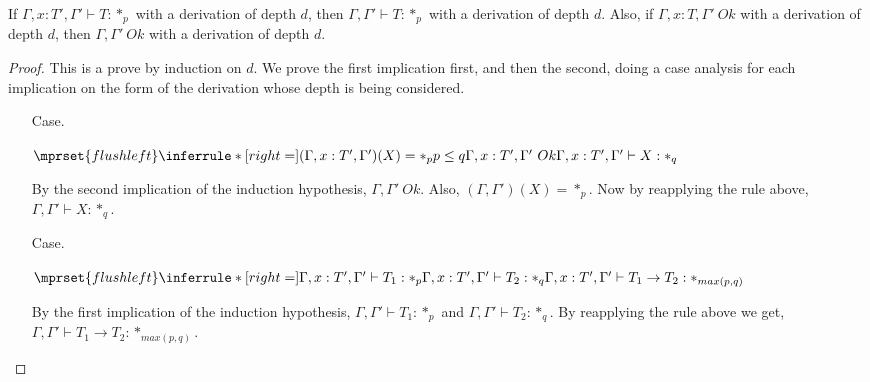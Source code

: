 \begin{lemma}
  If $\Gamma,x:T',\Gamma' \vdash T:*_p$ with a derivation of depth $d$, then 
  $\Gamma,\Gamma' \vdash T:*_p$ with a derivation of depth $d$.  Also, if 
  $\Gamma,x:T,\Gamma'\ Ok$ with a 
  derivation of depth $d$, then $\Gamma,\Gamma'\ Ok$ with a derivation of depth $d$.
  \label{lemma:context_strengthening_for_kinding_ssf}
\end{lemma}
\begin{proof}
  This is a prove by induction on $d$.  We prove the first implication first, and then the 
  second, doing a case analysis for each implication on the form of the derivation whose depth 
  is being considered.

  \begin{itemize}
  \item[Case.]\ \\
    \begin{center}
      \begin{math}
        $$\mprset{flushleft}
        \inferrule* [right=] {
          (\Gamma,x:T',\Gamma')(X) = *_p
          \\
          p \leq q
          \\
          \Gamma,x:T',\Gamma'\ Ok
        }{\Gamma,x:T',\Gamma' \vdash X : *_q}
      \end{math}
    \end{center}
    
    By the second implication of the induction hypothesis, $\Gamma,\Gamma'\ Ok$. Also, 
    $(\Gamma,\Gamma')(X) = *_p$.  Now by reapplying the rule above, 
    $\Gamma,\Gamma' \vdash X:*_q$.
    
  \item[Case.]\ \\
    \begin{center}
      \begin{math}
        $$\mprset{flushleft}
        \inferrule* [right=] {
          \Gamma,x:T',\Gamma' \vdash T_1 : *_p
          \\
          \Gamma,x:T',\Gamma' \vdash T_2 : *_q
        }{\Gamma,x:T',\Gamma' \vdash T_1 \rightarrow T_2 : *_{max(p,q)}}
      \end{math}
    \end{center}
    
    By the first implication of the induction hypothesis, $\Gamma,\Gamma' \vdash T_1:*_p$ and 
    $\Gamma,\Gamma' \vdash T_2:*_q$.  By reapplying the rule above we get, 
    $\Gamma,\Gamma' \vdash T_1 \rightarrow T_2:*_{max(p,q)}$.
    

\end{itemize}
\end{proof}
